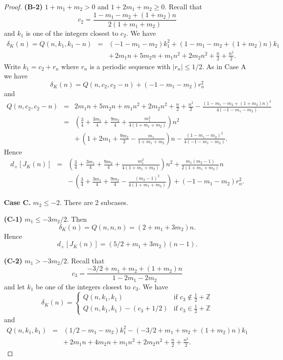 \documentclass[11pt]{amsart}
\theoremstyle{definition}
\def\BZ{\mathbb Z}
\begin{document}
\begin{proof}
\textbf{(B-2)} $1 + m_1 + m_2 > 0$ and $1 + 2m_1 + m_2 \ge 0$. Recall that $$c_2=\frac{1 - m_1 - m_2 + (1 + m_2) n}{2 (1 + m_1 + m_2)}$$
and $k_1$ is one of the integers closest to $c_2$. We have 
\begin{eqnarray*}
\delta_K(n) = Q(n,k_1,k_1-n)
&=& (-1-m_1-m_2) k_1^2 + ( 1 - m_1 - m_2 + (1 + m_2) n) k_1 \\
&& + \, 2 m_1 n + 5 m_2 n  + m_1 n^2 + 2 m_2 n^2 + \frac{n}{2} + \frac{n^2}{2}.
\end{eqnarray*}
Write $k_1 = c_2 + r_n$ where $r_n$ is a periodic sequence with $|r_n| \le 1/2$.  As in Case A we have 
$$\delta_K(n) = Q(n,c_2,c_2-n) + (-1-m_1-m_2)r_n^2$$
and
\begin{eqnarray*}
Q(n,c_2,c_2-n) &=&  2 m_1 n + 5 m_2 n  + m_1 n^2 + 2 m_2 n^2 + \frac{n}{2} + \frac{n^2}{2} - \frac{( 1 - m_1 - m_2 + (1 + m_2) n)^2}{4(-1-m_1-m_2)} \\
&=& \left( \frac{3}{4} + \frac{3m_1}{4} + \frac{9m_2}{4} +  \frac{m_1^2}{4(1 + m_1 + m_2)} \right) n^2  \\
&& + \,  \left( 1 + 2m_1 + \frac{9m_2}{2}  - \frac{m_1}{1 + m_1 + m_2} \right) n - \frac{( 1 - m_1 - m_2)^2}{4(-1-m_1-m_2)}.
\end{eqnarray*} 
Hence 
\begin{eqnarray*}
d_+[J_K(n)] &=& \left( \frac{3}{4} + \frac{3m_1}{4} + \frac{9m_2}{4} +  \frac{m_1^2}{4(1 + m_1 + m_2)} \right) n^2 + \frac{m_1(m_2-1)}{2(1+m_1+m_2)} n\\
&& - \,  \left( \frac{3}{4} + \frac{3m_1}{4} + \frac{9m_2}{4} - \frac{(m_2 - 1)^2}{4(1 + m_1 + m_2)}\right) + (-1-m_1-m_2)r_n^2.
\end{eqnarray*}
\medskip

\textbf{Case C.} $m_2 \le -2$. There are 2 subcases.

\textbf{(C-1)} $m_1 \le -3m_2/2$. Then 
$$\delta_K(n) = Q(n,n,n)=(2 + m_1 + 3 m_2) n.$$
Hence $$d_+[J_K(n)] = (5/2 + m_1 + 3 m_2) (n-1).$$ 

\textbf{(C-2)} $m_1 > -3m_2/2$. Recall that $$c_3=\frac{-3/2 + m_1 + m_2 + (1+m_2 ) n}{1-2m_1-2m_2}$$
and let $k_1$ be one of the integers closest to $c_3$. We have
$$\delta_K(n) = \begin{cases} Q(n,k_1,k_1) &\mbox{if } c_3 \notin \frac{1}{2} + \BZ \\ 
Q(n,k_1,k_1)-(c_3 + 1/2) & \mbox{if } c_3 \in \frac{1}{2} + \BZ \end{cases}$$
and
\begin{eqnarray*}
Q(n,k_1,k_1)
&=& \left( 1/2-m_1-m_2 \right) k_1^2 - \left( -3/2 + m_1 + m_2 + (1+m_2 ) n \right) k_1 \\
&& + \, 2 m_1 n + 4 m_2 n  + m_1 n^2 + 2 m_2 n^2 + \frac{n}{2} + \frac{n^2}{2}.
\end{eqnarray*}


\end{proof}
\end{document}
